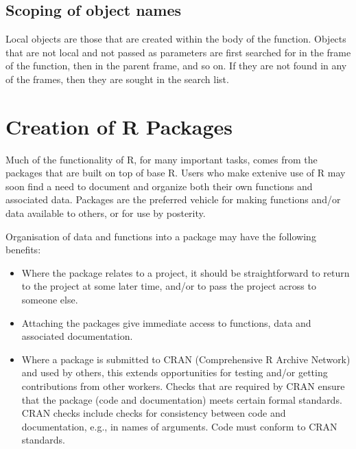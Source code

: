 \subsection*{Scoping of object names}
Local objects are those that are created within the body of the
function.  Objects that are not local and not passed as parameters are
first searched for in the frame of the function, then in the parent
frame, and so on. If they are not found in any of the frames, then
they are sought in the search list.

\section{Creation of R Packages}
Much of the functionality of R, for many important tasks, comes from
the packages that are built on top of base R. Users who make extenive
use of R may soon find a need to document and organize both their
own functions and associated data. Packages are the preferred vehicle
for making functions and/or data available to others, or for use by
posterity.

Organisation of data and functions into a package may have the
following benefits:
\begin{itemize}
\item Where the package relates to a project, it should be straightforward
to return to the project at some later time, and/or to pass the project
across to someone else.
\item Attaching the packages give immediate access to functions, data
  and associated documentation.
\item Where a package is submitted to CRAN (Comprehensive R Archive
  Network) and used by others, this extends opportunities for testing
  and/or getting contributions from other workers. Checks that are
  required by CRAN ensure that the package (code and documentation)
  meets certain formal standards.  CRAN checks include checks for
  consistency between code and documentation, e.g., in names of
  arguments.  Code must conform to CRAN standards.
\end{itemize}

